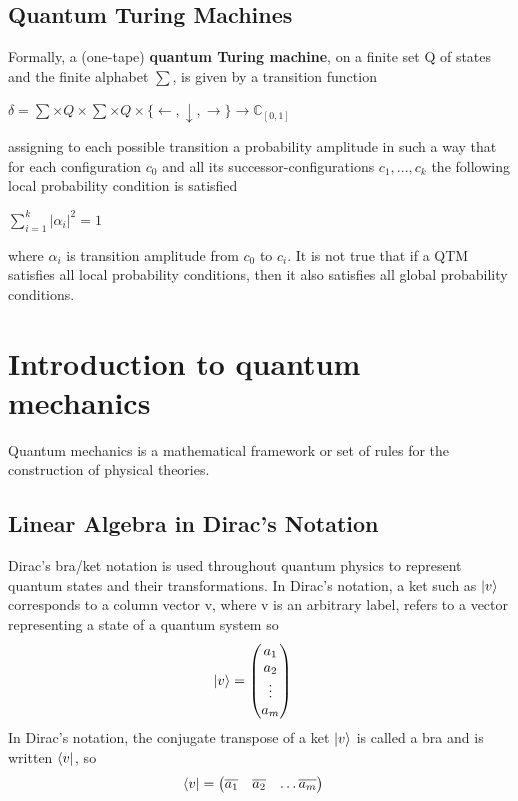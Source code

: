 \documentclass[11 pt]{article}
\theoremstyle{definition}
\theoremstyle{remark}
\let\conjugatet\overline
\begin{document}
\subsection{Quantum Turing Machines}
Formally, a (one-tape) \textbf{quantum Turing machine}, on a finite set Q of states and the
finite alphabet $\sum$, is given by a transition function
\begin{center}
$\delta = \sum \times Q \times \sum \times Q \times \{\leftarrow,\downarrow,\rightarrow\} \longrightarrow \mathbb{C}_[0,1]$
\end{center}
assigning to each possible transition a probability amplitude in such a way that for each configuration
$c_0$ and all its successor-configurations $c_1, . . ., c_k$ the following local probability condition is satisfied
\begin{center}
$\sum_{i=1}^{k}\left|\alpha_i\right |^2 = 1$
\end{center}
where $\alpha_i$ is transition amplitude from $c_0$ to $c_i$.\newline
It is not true that if a QTM satisfies all local probability conditions, then it also satisfies
all global probability conditions.


\section{Introduction to quantum mechanics}
Quantum mechanics is a mathematical framework or set of rules for the construction of physical theories.
\subsection{ Linear Algebra in Dirac’s Notation}
Dirac’s bra/ket notation is used throughout quantum physics to represent quantum states and their transformations. In Dirac’s notation, a ket such as $\ket{v}$ corresponds to a column vector v, where v is an arbitrary label, refers to a vector representing a state of a quantum system so
\begin{align}
    \ket{v} &= \begin{pmatrix}
           a_{1} \\
           a_{2} \\
           \vdots \\
           a_{m}
         \end{pmatrix}
  \end{align}
In Dirac’s notation, the conjugate transpose of a ket $\ket{v}$ is called a bra and is written $\bra{v}$, so
\begin{align}
\bra{v} &= \begin{pmatrix}
           \conjugatet{a_{1}} & \conjugatet{a_{2}} & \hdots \conjugatet{a_{m}}
         \end{pmatrix}
\end{align}
\end{document}
